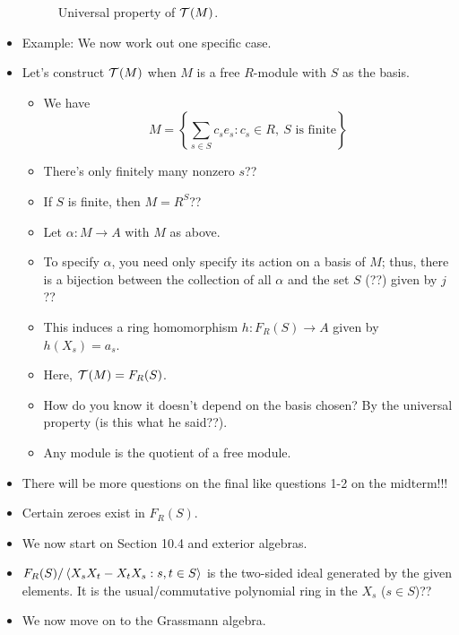 \documentclass[../notes.tex]{subfiles}
\begin{document}
\begin{itemize}
\begin{figure}[H]
        \caption{Universal property of $\mathcal{T}^{}(M)$.}
        \label{fig:univPropTM}
    \end{figure}
    \item Example: We now work out one specific case.
    \item Let's construct $\mathcal{T}^{}(M)$ when $M$ is a free $R$-module with $S$ as the basis.
    \begin{itemize}
        \item We have
        \begin{equation*}
            M = \left\{ \sum_{s\in S}c_se_s:c_s\in R,\ S\text{ is finite} \right\}
        \end{equation*}
        \item There's only finitely many nonzero $s$??
        \item If $S$ is finite, then $M=R^S$??
        \item Let $\alpha:M\to A$ with $M$ as above.
        \item To specify $\alpha$, you need only specify its action on a basis of $M$; thus, there is a bijection between the collection of all $\alpha$ and the set $S$ (??) given by $j$??
        \item This induces a ring homomorphism $h:F_R(S)\to A$ given by $h(X_s)=a_s$.
        \item Here, $\mathcal{T}^{}(M)=F_R(S)$.
        \item How do you know it doesn't depend on the basis chosen? By the universal property (is this what he said??).
        \item Any module is the quotient of a free module.
    \end{itemize}
    \item There will be more questions on the final like questions 1-2 on the midterm!!!
    \item Certain zeroes exist in $F_R(S)$.
    \item We now start on Section 10.4 and exterior algebras.
    \item $F_R(S)/\left\langle{X_sX_t-X_tX_s:s,t\in S}\right\rangle$ is the two-sided ideal generated by the given elements. It is the usual/commutative polynomial ring in the $X_s$ ($s\in S$)??
    \item We now move on to the Grassmann algebra.

\end{itemize}
\end{document}
